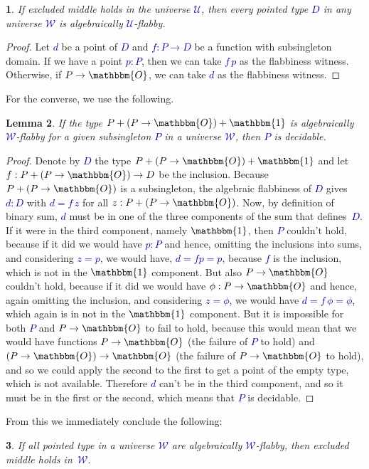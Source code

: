 \documentclass[10pt]{article}
\newcommand{\db}{\textcolor{darkblue}}
\newcommand{\m}[1]{\db{$#1$}}
\newcommand{\U}{\mathcal{U}}
\newcommand{\W}{\mathcal{W}}
\newcommand{\Zero}{\mathbbm{O}}
\newcommand{\One}{\mathbbm{1}}
\newtheorem{numbered}{}
\newtheorem{lemma}[numbered]{Lemma}
\theoremstyle{definition}
\begin{document}
\begin{numbered}
  If excluded middle holds in the universe \m{\U}, then every pointed
  type \m{D} in any universe \m{\W} is algebraically \m{\U}-flabby.
\end{numbered}
\begin{proof}
  Let \m{d} be a point of \m{D} and \m{f : P \to D} be a function with
  subsingleton domain. If we have a point \m{p : P}, then we can take
  \m{f \, p} as the flabbiness witness. Otherwise, if \m{P \to \Zero},
  we can take \m{d} as the flabbiness witness.
\end{proof}
\noindent
For the converse, we use the following.
\begin{lemma}
  If the type \m{P + (P \to \Zero) + \One} is algebraically
  \m{\W}-flabby for a given subsingleton \m{P} in a universe \m{\W},
  then \m{P} is decidable.
\end{lemma}
\begin{proof}
  Denote by \m{D} the type \m{P + (P \to \Zero) + \One} and let \m{f :
    P + (P \to \Zero) \to D} be the inclusion. Because \m{P + (P \to
    \Zero)} is a subsingleton, the algebraic flabbiness of \m{D} gives
  \m{d : D} with \m{d = f \, z} for all \m{z : P + (P \to \Zero)}.
  Now, by definition of binary sum, \m{d} must be in one of the three
  components of the sum that defines~\m{D}.  If it were in the third
  component, namely \m{\One}, then \m{P} couldn't hold, because if it
  did we would have \m{p:P} and hence, omitting the inclusions into
  sums, and considering \m{z=p}, we would have, \m{d = f p = p},
  because \m{f} is the inclusion, which is not in the \m{\One}
  component. But also \m{P \to \Zero} couldn't hold, because if it did
  we would have \m{\phi:P \to \Zero} and hence, again omitting the
  inclusion, and considering \m{z=\phi}, we would have \m{d = f \,
    \phi = \phi}, which again is in not in the \m{\One} component. But
  it is impossible for both \m{P} and \m{P \to \Zero} to fail to hold,
  because this would mean that we would have functions \m{P \to \Zero}
  (the failure of \m{P} to hold) and \m{(P \to \Zero) \to \Zero}
  (the failure of \m{P \to \Zero} to hold), and so we could apply the
  second to the first to get a point of the empty type, which is not
  available. Therefore \m{d} can't be in the third component, and so
  it must be in the first or the second, which means that \m{P} is
  decidable.
\end{proof}
\noindent From this we immediately conclude the following:
\begin{numbered}
  If all pointed type in a universe \m{\W} are algebraically \m{\W}-flabby, then excluded middle holds in~\m{\W}.
\end{numbered}
\end{document}
